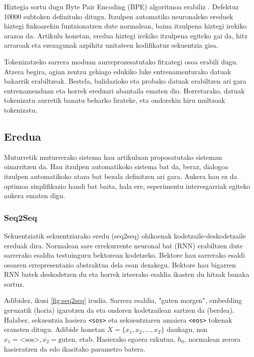 \documentclass[11pt,a4paper]{article}
\begin{document}
Hiztegia sortu dugu Byte Pair Encoding (BPE) algoritmoa erabiliz \citep{sennrich2015neural}. Defektuz 10000 subtoken definituko ditugu. Itzulpen automatiko neuronaleko ereduek hiztegi finkoarekin funtzionatzen dute normalean, baina itzulpena hiztegi irekiko arazoa da. Artikulu honetan, eredua hiztegi irekiko itzulpena egiteko gai da, hitz arraroak eta ezezagunak azpihitz unitateen kodifikatuz sekuentzia gisa.

Tokenizatzeko sarrera moduan aurreprozesatutako fitxategi osoa erabili dugu. Atzera begira, agian zentzu gehiago edukiko luke entrenamenturako datuak bakarrik erabiltzeak. Bestela, balidazioko eta probako datuak erabiltzen ari gara entrenamenduan eta horrek ereduari abantaila ematen dio. Horretarako, datuak tokenizatu aurretik banatu beharko lirateke, eta ondorekin hiru multzoak tokenizatu.

\subsection{Eredua}

Muturretik muturrerako sistema hau \citep{bahdanau2014neural} artikuluan proposatutako sisteman oinarritzen da. Hau itzulpen automatikoko sistema bat da, beraz, dialogoa itzulpen automatikoko ataza bat bezala definitzen ari gara. Aukera hau ez da optimoa sinplifikazio handi bat baita, hala ere, esperimentu interesgarriak egiteko aukera ematen digu.

\subsubsection{Seq2Seq}
Sekuentziatik sekuentziarako eredu (seq2seq) ohikoenak kodetzaile-deskodetzaile ereduak dira. Normalean sare errekurrente neuronal bat (RNN) erabiltzen dute sarrerako esaldia testuinguru bektorean kodetzeko. Bektore hau sarrerako esaldi osoaren errepresentazio abstraktua dela esan dezakegu. Bektore hau bigarren RNN batek deskodetzen du eta horrek irteerako esaldia ikasten du hitzak banaka sortuz.

Adibidez, ikusi \ref{fig:seq2seq} irudia. Sarrera esaldia, "guten morgen", embedding geruzatik (horia) igarotzen da eta ondoren kodetzailean sartzen da (berdea). Halaber, sekuentzia hasiera \texttt{<sos>} eta sekuentziaren amaiera \texttt{<eos>} tokenak eransten ditugu. Adibide honetan $X = \{x_1, x_2, ..., x_T\}$ daukagu, non $x_1 = \text{<sos>}, x_2 = \text{guten}$, etab. Hasierako egoera ezkutua, $h_0$, normalean zerora hasieratzen da edo ikasitako parametro batera.
\end{document}
